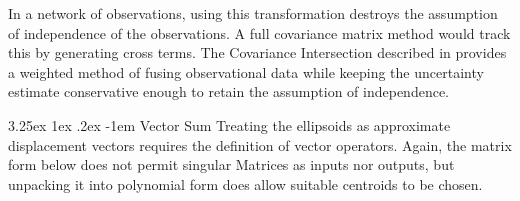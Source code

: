 \documentclass{article}
\makeatletter
\newcounter{subsubsubsection}[subsubsection]
\renewcommand\paragraph{\@startsection{paragraph}{5}{\z@}%
  {3.25ex \@plus1ex \@minus.2ex}%
  {-1em}%
  {\normalfont\normalsize\bfseries}}
\makeatother
\begin{document}
        In a network of observations, using this transformation destroys the assumption of independence of the observations.  A full covariance matrix method would track this by generating cross terms.  The Covariance Intersection described in \cite{CovarNoCorrel} provides a weighted method of fusing observational data while keeping the uncertainty estimate conservative enough to retain the assumption of independence.

      
        \paragraph{Vector Sum}
          Treating the ellipsoids as approximate displacement vectors requires the definition of vector operators.
          Again, the matrix form below does not permit singular Matrices as inputs nor outputs, but unpacking it into polynomial form does allow suitable centroids to be chosen.
\end{document}
